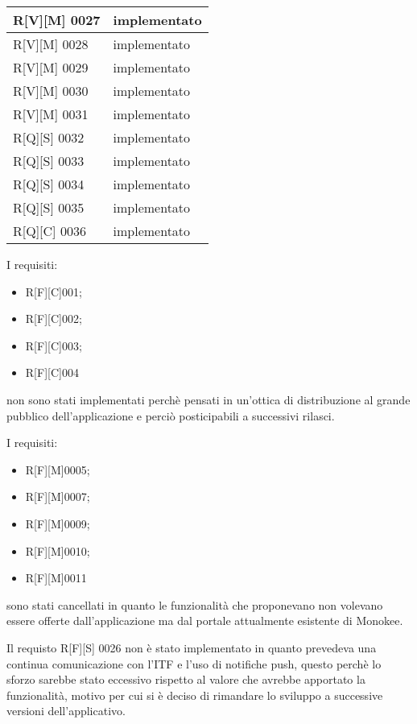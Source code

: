 \begin{center}
\begin{longtable}{|p{3cm}|p{3cm}|}
    \hline
    R[V][M] 0027    & implementato  \\
    \hline
    R[V][M] 0028    & implementato  \\
    \hline
    R[V][M] 0029    & implementato  \\
    \hline
    R[V][M] 0030    & implementato  \\
    \hline
    R[V][M] 0031    & implementato  \\
    \hline
    R[Q][S] 0032    & implementato  \\
    \hline
    R[Q][S] 0033    & implementato  \\
    \hline
    R[Q][S] 0034    & implementato  \\
    \hline
    R[Q][S] 0035    & implementato  \\
    \hline
    R[Q][C] 0036    & implementato  \\
    \hline
    \end{longtable}
    \end{center}

I requisiti:
\begin{itemize}
    \item R[F][C]001;
    \item R[F][C]002;
    \item R[F][C]003;
    \item R[F][C]004
\end{itemize}
non sono stati implementati perchè pensati in un'ottica di distribuzione al grande pubblico dell'applicazione e perciò posticipabili a successivi rilasci.

I requisiti: 
\begin{itemize}
    \item R[F][M]0005; 
    \item R[F][M]0007; 
    \item R[F][M]0009; 
    \item R[F][M]0010; 
    \item R[F][M]0011 
\end{itemize}
sono stati cancellati in quanto le funzionalità che proponevano non volevano essere offerte dall'applicazione ma dal portale attualmente esistente di Monokee.

Il requisto R[F][S] 0026 non è stato implementato in quanto prevedeva una continua comunicazione con l'ITF e l'uso di notifiche push, questo perchè lo sforzo sarebbe stato eccessivo rispetto al valore che avrebbe apportato la funzionalità, motivo per cui si è deciso di rimandare lo sviluppo a successive versioni dell'applicativo.

